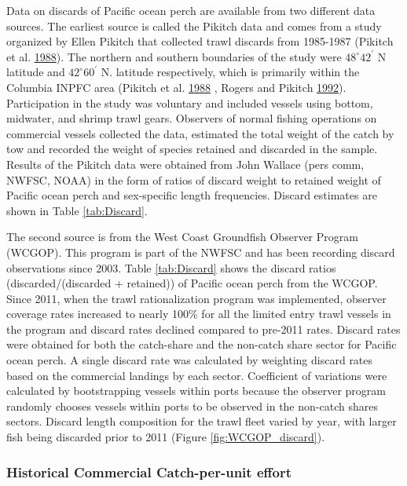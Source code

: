 \documentclass[12pt,]{article}
\begin{document}
Data on discards of Pacific ocean perch are available from two different
data sources. The earliest source is called the Pikitch data and comes
from a study organized by Ellen Pikitch that collected trawl discards
from 1985-1987 (Pikitch et al.
\protect\hyperlink{ref-pikitch_evaluation_1988}{1988}). The northern and
southern boundaries of the study were \(48^\circ 42^\prime\) N latitude
and \(42^\circ 60^\prime\) N. latitude respectively, which is primarily
within the Columbia INPFC area (Pikitch et al.
\protect\hyperlink{ref-pikitch_evaluation_1988}{1988} , Rogers and
Pikitch \protect\hyperlink{ref-rogers_numerical_1992}{1992}).
Participation in the study was voluntary and included vessels using
bottom, midwater, and shrimp trawl gears. Observers of normal fishing
operations on commercial vessels collected the data, estimated the total
weight of the catch by tow and recorded the weight of species retained
and discarded in the sample. Results of the Pikitch data were obtained
from John Wallace (pers comm, NWFSC, NOAA) in the form of ratios of
discard weight to retained weight of Pacific ocean perch and
sex-specific length frequencies. Discard estimates are shown in Table
\ref{tab:Discard}.

The second source is from the West Coast Groundfish Observer Program
(WCGOP). This program is part of the NWFSC and has been recording
discard observations since 2003. Table \ref{tab:Discard} shows the
discard ratios (discarded/(discarded + retained)) of Pacific ocean perch
from the WCGOP. Since 2011, when the trawl rationalization program was
implemented, observer coverage rates increased to nearly 100\% for all
the limited entry trawl vessels in the program and discard rates
declined compared to pre-2011 rates. Discard rates were obtained for
both the catch-share and the non-catch share sector for Pacific ocean
perch. A single discard rate was calculated by weighting discard rates
based on the commercial landings by each sector. Coefficient of
variations were calculated by bootstrapping vessels within ports because
the observer program randomly chooses vessels within ports to be
observed in the non-catch shares sectors. Discard length composition for
the trawl fleet varied by year, with larger fish being discarded prior
to 2011 (Figure \ref{fig:WCGOP_discard}).

\subsubsection{Historical Commercial Catch-per-unit
effort}\label{historical-commercial-catch-per-unit-effort}
\end{document}
